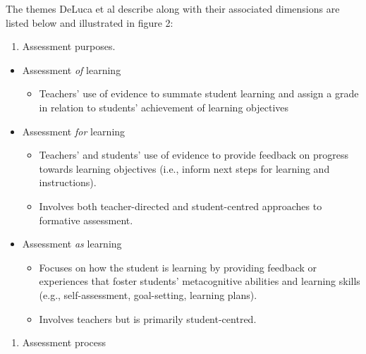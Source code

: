 \documentclass[
]{book}
\providecommand{\tightlist}{%
  \setlength{\itemsep}{0pt}\setlength{\parskip}{0pt}}
\begin{document}
The themes DeLuca et al \citeyearpar[p.~10]{delucaExploringAssessmentCultures2021} describe along with their associated dimensions are listed below and illustrated in figure 2:

\begin{enumerate}
\def\labelenumi{\arabic{enumi}.}
\tightlist
\item
  Assessment purposes.\\
\end{enumerate}

\begin{itemize}
\tightlist
\item
  Assessment \emph{of} learning

  \begin{itemize}
  \tightlist
  \item
    Teachers' use of evidence to summate student learning and assign a grade in relation to students' achievement of learning objectives\\
  \end{itemize}
\item
  Assessment \emph{for} learning

  \begin{itemize}
  \tightlist
  \item
    Teachers' and students' use of evidence to provide feedback on progress towards learning objectives (i.e., inform next steps for learning and instructions).\\
  \item
    Involves both teacher-directed and student-centred approaches to formative assessment.\\
  \end{itemize}
\item
  Assessment \emph{as} learning

  \begin{itemize}
  \tightlist
  \item
    Focuses on how the student is learning by providing feedback or experiences that foster students' metacognitive abilities and learning skills (e.g., self-assessment, goal-setting, learning plans).\\
  \item
    Involves teachers but is primarily student-centred.\\
  \end{itemize}
\end{itemize}

\begin{enumerate}
\def\labelenumi{\arabic{enumi}.}
\setcounter{enumi}{1}
\tightlist
\item
  Assessment process\\
\end{enumerate}
\end{document}
